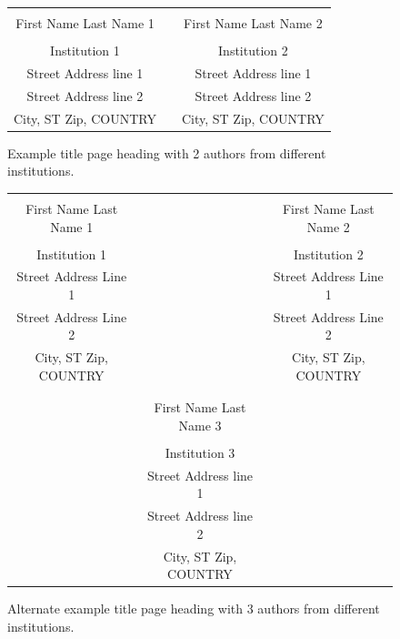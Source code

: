 \documentclass{wscpaperproc}
\theoremstyle{wsc}
\begin{document}
\begin{figure}[htb]
{
\centering
\begin{tabular}{ccc}
\phantom{Entries to adjust spacing - ignore} & \phantom{intermediate space} & \phantom{Entries to adjust spacing - ignore} \\
First Name Last Name 1 & & First Name Last Name 2 \\
\\
Institution 1 & & Institution 2 \\
Street Address line 1 & & Street Address line 1 \\
Street Address line 2 & & Street Address line 2 \\
City, ST Zip, COUNTRY & & City, ST Zip, COUNTRY
\end{tabular}
\caption{Example title page heading with 2 authors from different institutions.\label{fig: 2 different}}
}
\end{figure}



\begin{figure}[htb]
{
\centering
\begin{tabular}{ccc}
\phantom{This adjusts spacing - ignore} & \phantom{This adjusts spacing - ignore} & \phantom{This adjusts spacing - ignore} \\
First Name Last Name 1 & & First Name Last Name 2 \\
\\
Institution 1 & & Institution 2 \\
Street Address Line 1 & & Street Address Line 1 \\
Street Address Line 2 & & Street Address Line 2 \\
City, ST Zip, COUNTRY & & City, ST Zip, COUNTRY \\
\\
\\
& First Name Last Name 3 \\
\\
& Institution 3\\
& Street Address line 1 \\
& Street Address line 2 \\
& City, ST Zip, COUNTRY
\end{tabular}
\caption{Alternate example title page heading with 3 authors from different institutions. \label{fig: 3 different}}
}
\end{figure}
\end{document}
